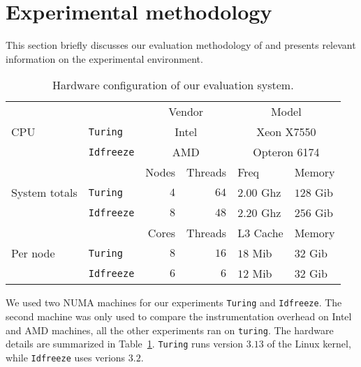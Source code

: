 
\section{Experimental methodology}
\label{sec:metho}

This section briefly discusses our evaluation methodology of \TABARNAC and
presents relevant information on the experimental environment.

\begin{table}[htb]
    \centering
    \begin{tabular}{lp{1.1cm}rrp{1.35cm}p{1.1cm}}
        \toprule
        \multirow{3}{.8cm}{CPU}
        &  & \multicolumn{2}{c}{Vendor} & \multicolumn{2}{c}{Model} \\
        \cmidrule(lr){3-6}
        & \texttt{Turing}  & \multicolumn{2}{c}{Intel} & \multicolumn{2}{c}{Xeon X7550} \\
        & \texttt{Idfreeze} & \multicolumn{2}{c}{AMD} & \multicolumn{2}{c}{Opteron 6174} \\
        \midrule
        \midrule
        \multirow{3}{.8cm}{System totals}
        & & Nodes & Threads & Freq & Memory \\
        \cmidrule(lr){3-6}
        & \texttt{Turing}   & $4$ & $64$ & $2.00$ Ghz & $128$ Gib \\
        & \texttt{Idfreeze} & $8$ & $48$ & $2.20$ Ghz & $256$ Gib\\
        \midrule
        \midrule
        \multirow{3}{.8cm}{Per node}
        & & Cores & Threads & L3 Cache & Memory \\
        \cmidrule(lr){3-6}
        & \texttt{Turing}   & $8$ & $16$ & $18$ Mib & $32$ Gib \\
        & \texttt{Idfreeze} & $6$ & $6$  & $12$ Mib & $32$ Gib \\
        \bottomrule
    \end{tabular}
    \caption{Hardware configuration of our evaluation system.}
    \label{tab:hw}
\end{table}

We used two NUMA machines for our experiments \texttt{Turing} and
\texttt{Idfreeze}. The second machine was only used to compare the
instrumentation overhead on Intel and AMD machines, all the other experiments
ran on \texttt{turing}. The hardware details are
summarized in Table~\ref{tab:hw}. \texttt{Turing} runs version $3.13$ of the
Linux kernel, while \texttt{Idfreeze} uses verions $3.2$.

